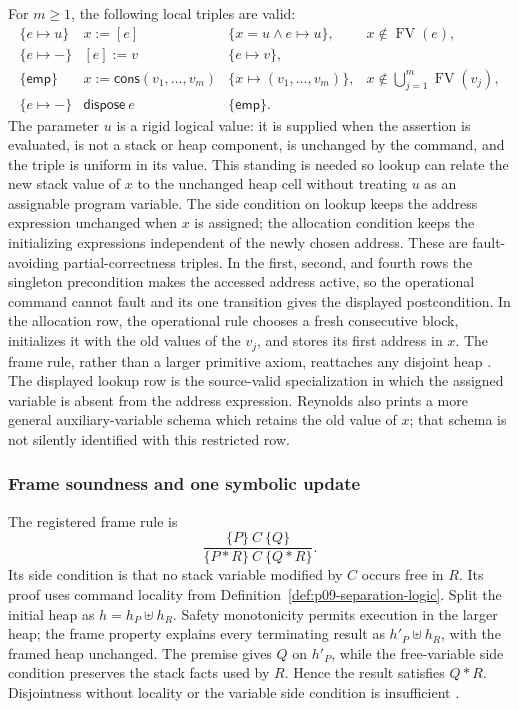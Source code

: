 For \(m\geq1\), the following local triples are valid:
\[
\begin{array}{rcll}
 \{e\mapsto u\}
   &x:=[e]&
 \{x=u\land e\mapsto u\},
 &x\notin\operatorname{FV}(e),\\[2pt]
 \{e\mapsto-\}
   &[e]:=v&
 \{e\mapsto v\},&\\[2pt]
 \{\mathsf{emp}\}
   &x:=\mathsf{cons}(v_1,\ldots,v_m)&
 \{x\mapsto(v_1,\ldots,v_m)\},
 &x\notin\bigcup_{j=1}^{m}\operatorname{FV}(v_j),\\[2pt]
 \{e\mapsto-\}
   &\mathsf{dispose}\ e&
 \{\mathsf{emp}\}.&
\end{array}
\]
The parameter \(u\) is a rigid logical value: it is supplied when the
assertion is evaluated, is not a stack or heap component, is unchanged by the
command, and the triple is uniform in its value.  This standing is needed so
lookup can relate the new stack value of \(x\) to the unchanged heap cell
without treating \(u\) as an assignable program variable.  The side condition
on lookup keeps the address expression unchanged when \(x\) is assigned; the allocation
condition keeps the initializing expressions independent of the newly chosen
address.  These are fault-avoiding partial-correctness triples.  In the first,
second, and fourth rows the singleton precondition makes the accessed address
active, so the operational command cannot fault and its one transition gives
the displayed postcondition.  In the allocation row, the operational rule
chooses a fresh consecutive block, initializes it with the old values of the
\(v_j\), and stores its first address in \(x\).  The frame rule, rather than a
larger primitive axiom, reattaches any disjoint heap
\cite[pp.~61--63]{ReynoldsSeparation2002}.  The displayed lookup row is the
source-valid specialization in which the assigned variable is absent from the
address expression.  Reynolds also prints a more general auxiliary-variable
schema which retains the old value of \(x\); that schema is not silently
identified with this restricted row.

\subsubsection{Frame soundness and one symbolic update}

The registered frame rule is
\[
 \frac{\{P\}\ C\ \{Q\}}
      {\{P*R\}\ C\ \{Q*R\}}.
\]
Its side condition is that no stack variable modified by \(C\) occurs free in
\(R\).  Its proof uses command locality from
Definition~\ref{def:p09-separation-logic}.  Split the initial heap as
\(h=h_P\uplus h_R\).  Safety monotonicity permits execution in the larger heap;
the frame property explains every terminating result as
\(h'_P\uplus h_R\), with the framed heap unchanged.  The premise gives \(Q\) on
\(h'_P\), while the free-variable side condition preserves the stack facts used
by \(R\).  Hence the result satisfies \(Q*R\).  Disjointness without locality or
the variable side condition is insufficient \cite[\S\S3--5]{OHearnReynoldsYang2001}.

